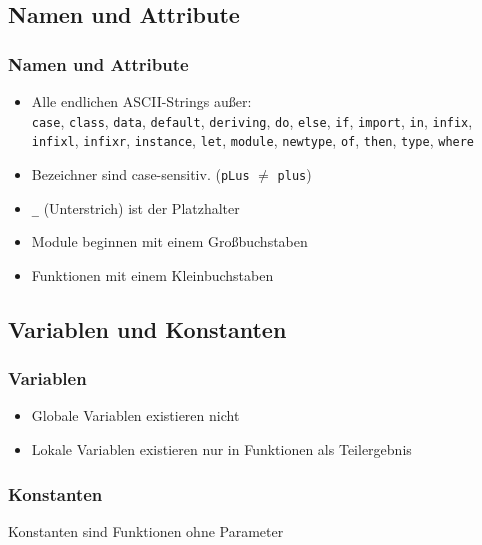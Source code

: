 \subsection{Namen und Attribute}
\begin{frame}
\frametitle{Namen und Attribute}
\begin{block}{\vspace*{-3ex}}
\begin{itemize}
  \item Alle endlichen ASCII-Strings außer:
  \\ \lstinline|case|, \lstinline|class|, \lstinline|data|, \lstinline|default|, \lstinline|deriving|, \lstinline|do|, \lstinline|else|, \lstinline|if|, \lstinline|import|, \lstinline|in|, \lstinline|infix|, \lstinline|infixl|, \lstinline|infixr|, \lstinline|instance|, \lstinline|let|, \lstinline|module|, \lstinline|newtype|, \lstinline|of|, \lstinline|then|, \lstinline|type|, \lstinline|where|
  \item Bezeichner sind case-sensitiv. (\lstinline|pLus| $\neq$ \lstinline|plus|) 
  \item \lstinline|_| (Unterstrich) ist der Platzhalter
  \item Module beginnen mit einem Großbuchstaben
  \item Funktionen mit einem Kleinbuchstaben
\end{itemize}
\end{block}
\end{frame}

\subsection{Variablen und Konstanten}
\begin{frame}
\frametitle{Variablen}
\begin{block}{\vspace*{-3ex}}
\begin{itemize}
  \item Globale Variablen existieren nicht
  \item Lokale Variablen existieren nur in Funktionen als Teilergebnis
\end{itemize}
\end{block}
\end{frame}

\begin{frame}
\frametitle{Konstanten}
\begin{block}{\vspace*{-3ex}}
Konstanten sind Funktionen ohne Parameter
\end{block}
\end{frame}

